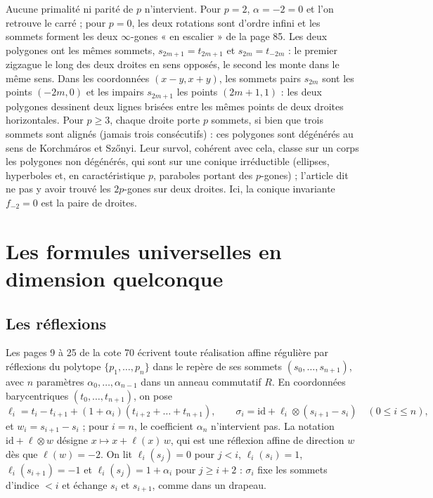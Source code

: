 \documentclass[11pt,a4paper]{amsart}
\theoremstyle{definition}
\theoremstyle{plain}
\theoremstyle{remark}
\newcommand{\id}{\mathrm{id}}
\begin{document}
Aucune primalité ni parité de $p$ n'intervient. Pour $p = 2$, $\alpha = -2 = 0$ et l'on retrouve le carré ; pour $p = 0$, les deux rotations sont d'ordre infini et les sommets forment les deux $\infty$-gones « en escalier » de la page 85. Les deux polygones ont les mêmes sommets, $s_{2m+1} = t_{2m+1}$ et $s_{2m} = t_{-2m}$ : le premier zigzague le long des deux droites en sens opposés, le second les monte dans le même sens. Dans les coordonnées $(x - y, x + y)$, les sommets pairs $s_{2m}$ sont les points $(-2m, 0)$ et les impairs $s_{2m+1}$ les points $(2m+1, 1)$ : les deux polygones dessinent deux lignes brisées entre les mêmes points de deux droites horizontales. Pour $p \ge 3$, chaque droite porte $p$ sommets, si bien que trois sommets sont alignés (jamais trois consécutifs) : ces polygones sont dégénérés au sens de Korchmáros et Sz\H{o}nyi. Leur survol, cohérent avec cela, classe sur un corps les polygones non dégénérés, qui sont sur une conique irréductible (ellipses, hyperboles et, en caractéristique $p$, paraboles portant des $p$-gones) ; l'article dit ne pas y avoir trouvé les $2p$-gones sur deux droites. Ici, la conique invariante $f_{-2} = 0$ est la paire de droites.

\section{Les formules universelles en dimension quelconque}

\subsection{Les réflexions}

Les pages 9 à 25 de la cote 70 écrivent toute réalisation affine régulière par réflexions du polytope $\{p_1, \dots, p_n\}$ dans le repère de ses sommets $(s_0, \dots, s_{n+1})$, avec $n$ paramètres $\alpha_0, \dots, \alpha_{n-1}$ dans un anneau commutatif $R$. En coordonnées barycentriques $(t_0, \dots, t_{n+1})$, on pose
\[
\ell_i = t_i - t_{i+1} + (1 + \alpha_i)(t_{i+2} + \dots + t_{n+1}), \qquad \sigma_i = \id + \ell_i \otimes (s_{i+1} - s_i) \quad (0 \le i \le n),
\]
et $w_i = s_{i+1} - s_i$ ; pour $i = n$, le coefficient $\alpha_n$ n'intervient pas. La notation $\id + \ell \otimes w$ désigne $x \mapsto x + \ell(x)\,w$, qui est une réflexion affine de direction $w$ dès que $\ell(w) = -2$. On lit $\ell_i(s_j) = 0$ pour $j < i$, $\ell_i(s_i) = 1$, $\ell_i(s_{i+1}) = -1$ et $\ell_i(s_j) = 1 + \alpha_i$ pour $j \ge i + 2$ : $\sigma_i$ fixe les sommets d'indice $< i$ et échange $s_i$ et $s_{i+1}$, comme dans un drapeau.
\end{document}
